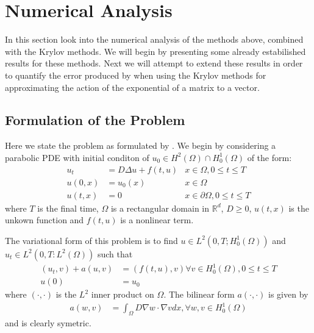 \section{Numerical Analysis}

In this section look into the numerical analysis of the methods above, combined with the Krylov methods.
We will begin by presenting some already estabilished results for these methods.
Next we will attempt to extend these results in order to quantify the error produced by when using the Krylov methods for approximating the action of the exponential of a matrix to a vector.

\subsection{Formulation of the Problem}
Here we state the problem as formulated by \cite{Huang2022}.
We begin by considering a parabolic PDE with initial conditon of $u_0 \in H^2(\Omega) \cap H^1_0(\Omega)$ of the form:
\begin{align*}
    u_t &= D \Delta u + f(t,u) &x\in \Omega, 0 \leq t \leq T\\
    u(0,x) &= u_0(x) &x\in \Omega\\
    u(t,x) &= 0 &x\in \partial \Omega, 0 \leq t \leq T
\end{align*}
where $T$ is the final time, $\Omega$ is a rectangular domain in $\mathbb{R}^d$, $D\geq 0$, $u(t,x)$ is the unkown function and $f(t,u)$ is a nonlinear term.

The variational form of this problem is to find $u\in L^2(0,T;H^1_0(\Omega))$ and $u_t \in L^2(0,T: L^2(\Omega))$ such that
\begin{align*}
    (u_t, v) + a(u, v) &= (f(t,u),v) \forall v \in H^1_0(\Omega), 0\leq t \leq T\\
    u(0) &= u_0
\end{align*}
where $(\cdot,\cdot)$ is the $L^2$ inner product on $\Omega$.
The bilinear form $a(\cdot,\cdot)$ is given by
\begin{align*}
    a(w,v) &= \int_{\Omega} D \nabla w \cdot \nabla v dx, \forall w, v \in H^1_0(\Omega)
\end{align*}
and is clearly symetric.

